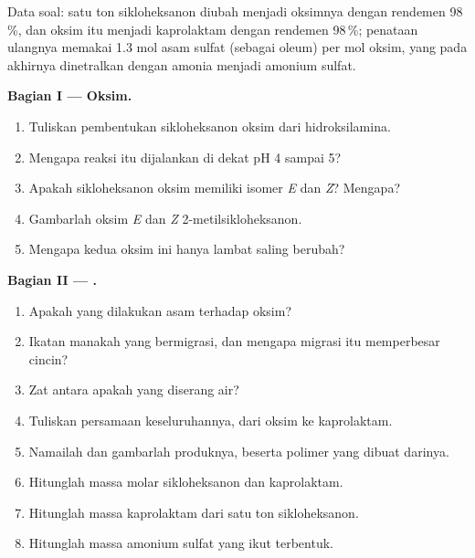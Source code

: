 \begin{problem}
\label{pb:b3:radicals-carbenes:1}
Data soal: satu ton sikloheksanon diubah menjadi oksimnya dengan rendemen
98\,\%, dan oksim itu menjadi kaprolaktam dengan rendemen 98\,\%; penataan ulangnya memakai
1.3 mol asam sulfat (sebagai oleum) per mol oksim, yang pada akhirnya dinetralkan dengan
amonia menjadi amonium sulfat.

\medskip\noindent\textbf{Bagian I --- Oksim.}
\begin{enumerate}[beginpenalty=10000]
  \item Tuliskan pembentukan sikloheksanon oksim dari hidroksilamina.
  \item Mengapa reaksi itu dijalankan di dekat pH 4 sampai 5?
  \item Apakah sikloheksanon oksim memiliki isomer \textit{E} dan \textit{Z}? Mengapa?
  \item Gambarlah oksim \textit{E} dan \textit{Z} 2-metilsikloheksanon.
  \item Mengapa kedua oksim ini hanya lambat saling berubah?
\end{enumerate}

\medskip\noindent\textbf{Bagian II --- .}
\begin{enumerate}[resume, beginpenalty=10000]
  \item Apakah yang dilakukan asam terhadap oksim?
  \item Ikatan manakah yang bermigrasi, dan mengapa migrasi itu memperbesar cincin?
  \item Zat antara apakah yang diserang air?
  \item Tuliskan persamaan keseluruhannya, dari oksim ke kaprolaktam.
  \item Namailah dan gambarlah produknya, beserta polimer yang dibuat darinya.
  \item Hitunglah massa molar sikloheksanon dan kaprolaktam.
  \item Hitunglah massa kaprolaktam dari satu ton sikloheksanon.
  \item Hitunglah massa amonium sulfat yang ikut terbentuk.
\end{enumerate}


\end{problem}
